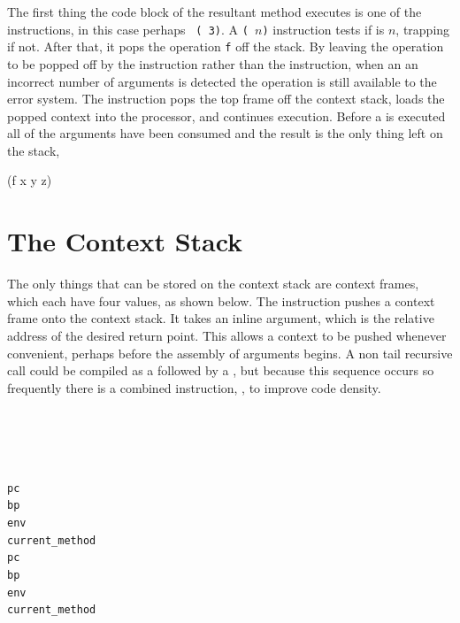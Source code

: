 The first thing the code block of the resultant method executes is one
of the  instructions, in this case perhaps {\tt
( 3)}.  A \texttt{( $n$)} instruction
tests if  is $n$, trapping if not.  After that, it pops the
operation \texttt{f} off the stack.  By leaving the operation to be
popped off by the  instruction rather than the
 instruction, when an an incorrect number of arguments is
detected the operation is still available to the error system.  The
 instruction pops the top frame off the context stack,
loads the popped context into the processor, and continues execution.
Before a
 is executed all of the arguments have been consumed and
the result is the only thing left on the stack,
\begin{stackphoto}
 (f x y z) \\\hline
\end{stackphoto}

\section{The Context Stack}

The only things that can be stored on the context stack are context
frames, which each have four values, as shown below.  The 
instruction pushes a context frame onto the context stack.  It takes
an inline argument, which is the relative address of the desired
return point.  This allows a context to be pushed whenever convenient,
perhaps before the assembly of arguments begins.  A non tail
recursive call could be compiled as a  followed by a
, but because this sequence occurs so frequently there
is a combined instruction, , to improve code density.

\begin{stackphoto}\hline
  \tt {}  \\ \hline
  \tt {}  \\ \hline
  \tt {} \\\hline
  \tt {} \\\hline\hline
  \tt pc  \\ \hline
  \tt bp  \\ \hline
  \tt env \\\hline
  \tt current\_method \\\hline\hline
  \tt pc  \\ \hline
  \tt bp  \\ \hline
  \tt env \\\hline
  \tt current\_method \\\hline
\end{stackphoto}

